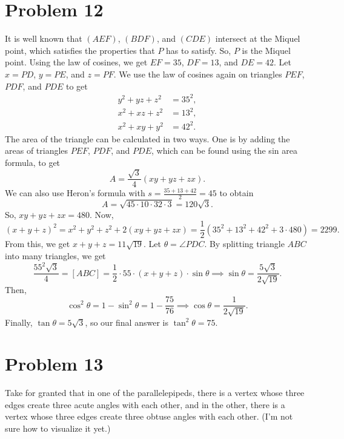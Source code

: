 \documentclass{scrartcl}
\begin{document}
\section*{Problem 12}
It is well known that $(AEF)$, $(BDF)$, and $(CDE)$ intersect
at the Miquel point, which satisfies the properties that $P$ has to satisfy.
So, $P$ is the Miquel point.
Using the law of cosines, we get $EF = 35$, $DF = 13$, and $DE = 42$.
Let $x = PD$, $y = PE$, and $z = PF$.
We use the law of cosines again on triangles $PEF$, $PDF$, and $PDE$ to get
\begin{align*}
y^2 + yz + z^2 &= 35^2, \\
x^2 + xz + z^2 &= 13^2, \\
x^2 + xy + y^2 &= 42^2.
\end{align*}
The area of the triangle can be calculated in two ways.
One is by adding the areas of triangles $PEF$, $PDF$, and $PDE$,
which can be found using the sin area formula,
to get
\[ A = \frac{\sqrt3}{4} (xy + yz + zx). \]
We can also use Heron's formula with $s = \frac{35 + 13 + 42}{2} = 45$ to obtain
\[ A = \sqrt{45 \cdot 10 \cdot 32 \cdot 3} = 120 \sqrt3. \]
So, $xy + yz + zx = 480$.
Now,
\[ (x+y+z)^2 = x^2 + y^2 + z^2 + 2(xy + yz + zx) = \frac12(35^2 + 13^2 + 42^2 + 3 \cdot 480) = 2299. \]
From this, we get $x+y+z = 11 \sqrt{19}$.
Let $\theta = \angle PDC$. By splitting triangle $ABC$ into many triangles,
we get
\[ \frac{55^2 \sqrt3}{4} = [ABC] = \frac12 \cdot 55 \cdot (x+y+z) \cdot \sin \theta \implies \sin \theta = \frac{5\sqrt 3}{2 \sqrt{19}}. \]
Then,
\[ \cos ^2 \theta = 1 - \sin ^2 \theta = 1 - \frac{75}{76} \implies \cos \theta = \frac{1}{2\sqrt{19}}. \]
Finally, $\tan \theta = 5 \sqrt 3$, so our final answer is $\tan^2 \theta = \boxed{75}$.
\section*{Problem 13}
Take for granted that in one of the parallelepipeds,
there is a vertex whose three edges create three acute angles with each other,
and in the other,
there is a vertex whose three edges create three obtuse angles with each other.
(I'm not sure how to visualize it yet.)
\end{document}
